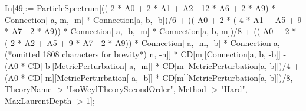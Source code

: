 In[49]:= ParticleSpectrum[((-2 * A0 + 2 * A1 + A2 - 12 * A6 + 2 * A9) * Connection[-a, m, -m] * Connection[a, b, -b])/6 + ((-A0 + 2 * (-4 * A1 + A5 + 9 * A7 - 2 * A9)) * Connection[-a, -b, -m] * Connection[a, b, m])/8 + ((-A0 + 2 * (-2 * A2 + A5 + 9 * A7 - 2 * A9)) * Connection[-a, -m, -b] * Connection[a, (*omitted 1808 characters for brevity*) n, -n]] * CD[m][Connection[a, b, -b]] - (A0 * CD[-b][MetricPerturbation[-a, -m]] * CD[m][MetricPerturbation[a, b]])/4 + (A0 * CD[-m][MetricPerturbation[-a, -b]] * CD[m][MetricPerturbation[a, b]])/8, TheoryName -> "IsoWeylTheorySecondOrder", Method -> "Hard", MaxLaurentDepth -> 1];